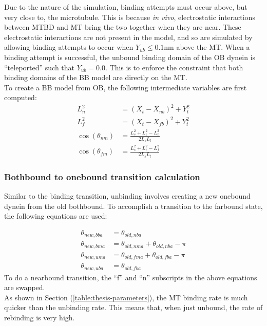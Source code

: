 \documentclass[
11pt, %
english, %
singlespacing, %
headsepline, %
chapterinoneline, %
]{MastersDoctoralThesis} %
\begin{document}
Due to the nature of the simulation, binding attempts must occur above, but very close to, the microtubule. This is because \textit{in vivo}, electrostatic interactions between MTBD and MT bring the two together when they are near. These electrostatic interactions are not present in the model, and so are simulated by allowing binding attempts to occur when $Y_{ub} \leq 0.1\text{nm}$ above the MT. When a binding attempt is successful, the unbound binding domain of the OB dynein is ``teleported'' such that $Y_{ub} = 0.0$. This is to enforce the constraint that both binding domains of the BB model are directly on the MT.\\

To create a BB model from OB, the following intermediate variables are first computed:\\

\begin{align}
  L_n^2 &= \left(X_t - X_{nb}\right)^2 + Y_t^2\\
  L_f^2 &= \left(X_t - X_{fb}\right)^2 + Y_t^2\\
  \cos(\theta_{nm}) &= \frac{L_s^2 + L_t^2 - L_n^2}{2L_sL_t}\\
  \cos(\theta_{fm}) &= \frac{L_s^2 + L_t^2 - L_f^2}{2L_sL_t}
\end{align}

\subsubsection{Bothbound to onebound transition calculation}
Similar to the binding transition, unbinding involves creating a new onebound dynein from the old bothbound. To accomplish a transition to the farbound state, the following equations are used:

\begin{align}
  \theta_{new,bba} &= \theta_{old,nba}\\
  \theta_{new,bma} &= \theta_{old,nma} + \theta_{old,nba} - \pi\\
  \theta_{new,uma} &= \theta_{old,fma} + \theta_{old,fba} - \pi\\
  \theta_{new,uba} &= \theta_{old,fba}
\end{align}
%
To do a nearbound transition, the ``f'' and ``n'' subscripts in the above equations are swapped.\\

As shown in Section (\ref{table:thesis-parameters}), the MT binding rate is much quicker than the unbinding rate. This means that, when just unbound, the rate of rebinding is very high.\\
\end{document}
